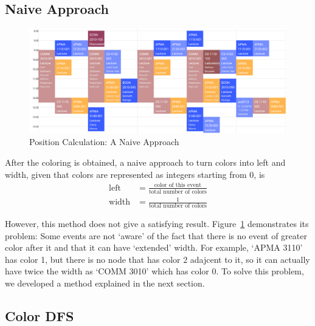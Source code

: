 \documentclass[12pt]{article}
\begin{document}
\subsection{Naive Approach}
\begin{figure}[H]
    \centering
    \includegraphics[width=\columnwidth]{pos-calc-exp1.png}
    \caption{Position Calculation: A Naive Approach}
    \label{fig:pos-naive}
\end{figure}
After the coloring is obtained, a naive approach to turn colors into left and width, given that colors are represented as integers starting from 0, is
\begin{align*}
    \text{left} &= \frac{\text{color of this event}}{\text{total number of colors}} \\
    \text{width} &= \frac{1}{\text{total number of colors}}
\end{align*}

However, this method does not give a satisfying result. Figure~\ref{fig:pos-naive} demonstrates its problem: Some events are not `aware' of the fact that there is no event of greater color after it and that it can have `extended' width. For example, `APMA 3110' has color 1, but there is no node that has color 2 adajcent to it, so it can actually have twice the width as `COMM 3010' which has color 0. To solve this problem, we developed a method explained in the next section. 

\subsection{Color DFS}
\end{document}
